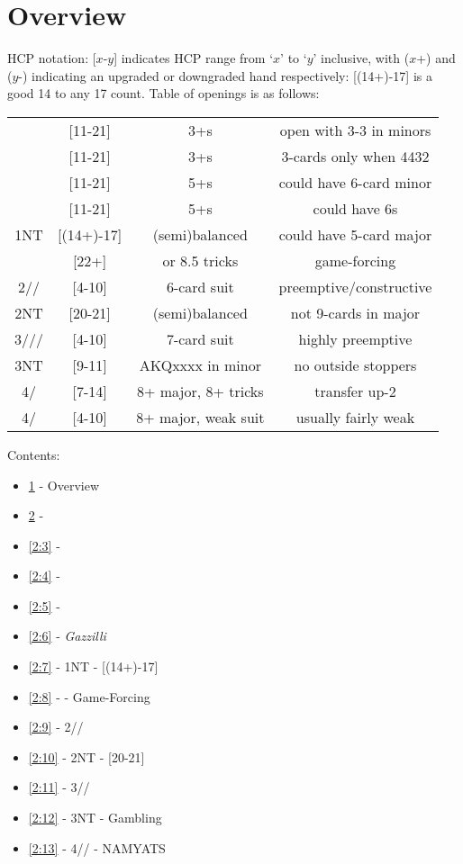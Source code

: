 \documentclass[12pt]{report}
\newcommand{\n}{\\}
\newcommand{\q}[1]{\multido{}{#1}{\qquad}}
\newcommand{\ul}[1]{\begin{itemize}#1\end{itemize}}
\newcommand{\li}[1]{\item[~] \q{#1}}
\newcommand{\bidsection}[2]{\section{\texorpdfstring{#1}{#2}}}
\begin{document}
\section{Overview} \label{2:1}
    HCP notation: [$x$-$y$] indicates HCP range from `$x$' to `$y$' inclusive, with ($x$+) and ($y$-) indicating an upgraded or downgraded hand respectively: [(14+)-17] is a good 14 to any 17 count. Table of openings is as follows:
    
\begin{center}
    \begin{tabular}{ |c|c|c|c| } 
        \hline
        \cl1                     & [11-21]    & 3+\cl{}s             & open with 3-3 in minors \n
        \di1                     & [11-21]    & 3+\di{}s             & 3-cards only when 4432  \n
        \he1                     & [11-21]    & 5+\he{}s             & could have 6-card minor \n
        \sp1                     & [11-21]    & 5+\sp{}s             & could have 6\he{}s      \n
        1NT                      & [(14+)-17] & (semi)balanced       & could have 5-card major \n
        \cl2                     & [22+]      & or 8.5 tricks        & game-forcing            \n
        2\di{}/\he{}/\sp{}       & [4-10]     & 6-card suit          & preemptive/constructive \n
        2NT                      & [20-21]    & (semi)balanced       & not 9-cards in major    \n
        3\cl{}/\di{}/\he{}/\sp{} & [4-10]     & 7-card suit          & highly preemptive       \n
        3NT                      & [9-11]     & AKQxxxx in minor     & no outside stoppers     \n
        4\cl{}/\di{}             & [7-14]     & 8+ major, 8+ tricks  & transfer up-2           \n
        4\he{}/\sp{}             & [4-10]     & 8+ major, weak suit  & usually fairly weak     \n
        \hline
    \end{tabular}
\end{center}
Contents:
\ul{
    \li0 \ref{2:1} - Overview
    \li0 \ref{2:2} - 
    \li0 \ref{2:3} - \di1
    \li0 \ref{2:4} - \he1
    \li0 \ref{2:5} - \sp1
    \li0 \ref{2:6} - \textit{Gazzilli}
    \li0 \ref{2:7} - 1NT - [(14+)-17]
    \li0 \ref{2:8} - \cl2 - Game-Forcing
    \li0 \ref{2:9} - 2\di{}/\he{}/\sp{}
    \li0 \ref{2:10} - 2NT - [20-21]
    \li0 \ref{2:11} - 3\cl{}/\di{}/\sp{}
    \li0 \ref{2:12} - 3NT - Gambling
    \li0 \ref{2:13} - 4\cl{}/\di{}/\he{}\sp{} - NAMYATS
}
\newpage
\bidsection{}{1♣} \label{2:2}
\end{document}
